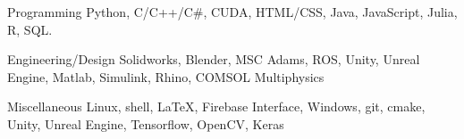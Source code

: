 

\begin{cvskills}

  \cvskill
    {Programming} %
    {Python, C/C++/C\#, CUDA, HTML/CSS, Java, JavaScript, Julia, R, SQL.} %

\cvskill
{Engineering/Design} %
{Solidworks, Blender, MSC Adams, ROS, Unity, Unreal Engine, Matlab, Simulink, Rhino, COMSOL Multiphysics} %

  \cvskill
    {Miscellaneous} %
    {Linux, shell, \LaTeX, Firebase Interface, Windows, git, cmake, Unity, Unreal Engine, Tensorflow, OpenCV, Keras} %
   


\end{cvskills}
